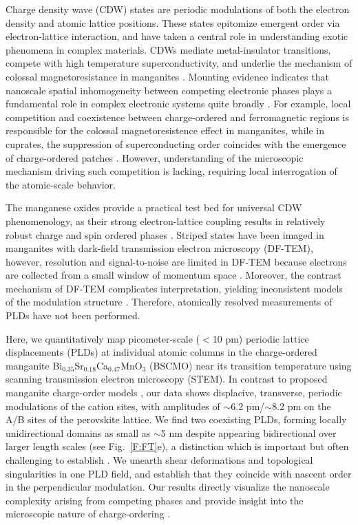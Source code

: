 \documentclass[12pt]{article}
\begin{document}
Charge density wave (CDW) states are periodic modulations of both the electron density and atomic lattice positions. 
These states epitomize emergent order via electron-lattice interaction, and have taken a central role in understanding exotic phenomena in complex materials. 
CDWs mediate metal-insulator transitions, compete with high temperature superconductivity, and underlie the mechanism of colossal magnetoresistance in manganites \cite{Yoshida2014,Uehara1999,Tomioka1996,Wu2011,Chang2012,Sipos2008}.
Mounting evidence indicates that nanoscale spatial inhomogeneity between competing electronic phases plays a fundamental role in complex electronic systems quite broadly \cite{Dagotto2005,Milward2005,lang2002imaging}. 
For example, local competition and coexistence between charge-ordered and ferromagnetic regions is responsible for the colossal magnetoresistence effect in manganites, while
in cuprates, the suppression of superconducting order coincides with the emergence of charge-ordered patches \cite{Uehara1999,Hoffman2002,Wise2008}.
However, understanding of the microscopic mechanism driving such competition is lacking, requiring local interrogation of the atomic-scale behavior.


The manganese oxides provide a practical test bed for universal CDW phenomenology, as their strong electron-lattice coupling results in relatively robust charge and spin ordered phases \cite{Mourachkine2002}.
Striped states have been imaged in manganites with dark-field transmission electron microscopy (DF-TEM), however, resolution and signal-to-noise are limited in DF-TEM because electrons are collected from a small window of momentum space \cite{mori1998pairing,cox2008very}.
Moreover, the contrast mechanism of DF-TEM complicates interpretation, yielding inconsistent models of the modulation structure \cite{mori1998pairing,cox2008very,Louden2007}.
Therefore, atomically resolved measurements of PLDs have not been performed.


Here, we quantitatively map picometer-scale ($<$10 pm) periodic lattice displacements (PLDs) at individual atomic columns in the charge-ordered manganite Bi$_{0.35}$Sr$_{0.18}$Ca$_{0.47}$MnO$_{3}$ (BSCMO) near its transition temperature using scanning transmission electron microscopy (STEM).
In contrast to proposed manganite charge-order models \cite{mori1998pairing,goff2004,daoud2002,daoud2008,johnstone2012}, our data shows displacive, transverse, periodic modulations of the cation sites, with amplitudes of $\sim$6.2 pm/$\sim$8.2 pm on the A/B sites of the perovskite lattice.
We find two coexisting PLDs, forming locally unidirectional domains as small as $\sim$5 nm despite appearing bidirectional over larger length scales (see Fig.~\ref{F:FT}e), 
a distinction which is important but often challenging to establish \cite{cox2008very,Comin2015,Hoffman2002,Kajimoto2003}.
We unearth shear deformations and topological singularities in one PLD field, and establish that they coincide with nascent order in the perpendicular modulation.
Our results directly visualize the nanoscale complexity arising from competing phases and provide insight into the microscopic nature of charge-ordering \cite{Uehara1999,Dagotto2005,Milward2005,lang2002imaging,Hoffman2002,Comin2015}.
\end{document}
